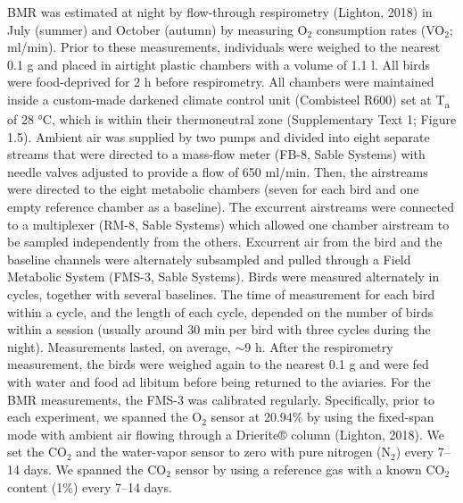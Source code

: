\documentclass[10pt, twoside]{book} %
\begin{document}
	BMR was estimated at night by flow-through respirometry (Lighton, 2018) in July (summer) and October (autumn) by measuring O$_{\text{2}}$ consumption rates (VO$_{\text{2}}$; ml/min). Prior to these measurements, individuals were weighed to the nearest 0.1 g and placed in airtight plastic chambers with a volume of 1.1 l. All birds were food-deprived for 2 h before respirometry. All chambers were maintained inside a custom-made darkened climate control unit (Combisteel R600) set at T\textsubscript{a} of 28 °C, which is within their thermoneutral zone (Supplementary Text 1; Figure 1.5). Ambient air was supplied by two pumps and divided into eight separate streams that were directed to a mass-flow meter (FB-8, Sable Systems) with needle valves adjusted to provide a flow of 650 ml/min. Then, the airstreams were directed to the eight metabolic chambers (seven for each bird and one empty reference chamber as a baseline). The excurrent airstreams were connected to a multiplexer (RM-8, Sable Systems) which allowed one chamber airstream to be sampled independently from the others. Excurrent air from the bird and the baseline channels were alternately subsampled and pulled through a Field Metabolic System (FMS-3, Sable Systems). Birds were measured alternately in cycles, together with several baselines. The time of measurement for each bird within a cycle, and the length of each cycle, depended on the number of birds within a session (usually around 30 min per bird with three cycles during the night). Measurements lasted, on average, $\sim$9 h. After the respirometry measurement, the birds were weighed again to the nearest 0.1 g and were fed with water and food ad libitum before being returned to the aviaries. For the BMR measurements, the FMS-3 was calibrated regularly. Specifically, prior to each experiment, we spanned the O$_{\text{2}}$ sensor at 20.94\% by using the fixed-span mode with ambient air flowing through a Drierite® column (Lighton, 2018). We set the CO$_{\text{2}}$ and the water-vapor sensor to zero with pure nitrogen (N$_{\text{2}}$) every 7–14 days. We spanned the CO$_{\text{2}}$ sensor by using a reference gas with a known CO$_{\text{2}}$ content (1\%) every 7–14 days.\\
\end{document}
